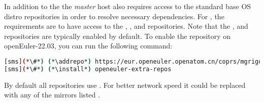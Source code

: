 In addition to the \OHPC{} 
\iftoggle{isxCAT}{and \xCAT{} package repositories,}{package repository,}
the {\em master} host also requires access to the standard base OS distro
repositories in order to resolve necessary dependencies. For \baseOS{}, the
requirements are to have access to the {\color{purple}{OS}},
{\color{purple}{Everything}}, {\color{purple}{EPOL main}} and
{\color{purple}{EPOL update}} repositories.  Note that the
{\color{purple}{OS}}, {\color{purple}{Everything}} and {\color{purple}{EPOL
main}} repositories are typically enabled by default.  To enable the 
{\color{purple}{EPOL update}} repository on openEuler-22.03, you can run the following
command:

\begin{lstlisting}[language=bash,keywords={},basicstyle=\fontencoding{T1}\fontsize{7.6}{10}\ttfamily]
[sms](*\#*) (*\addrepo*) https://eur.openeuler.openatom.cn/coprs/mgrigorov/OpenHPC/repo/openeuler-22.03_LTS_SP3/mgrigorov-OpenHPC-openeuler-22.03_LTS_SP3.repo
[sms](*\#*) (*\install*) openeuler-extra-repos
\end{lstlisting}


By default all repositories use {\color{blue}{http://repo.openeuler.org}}. 
For better network speed it could be replaced with any of the mirrors listed
\href{https://www.openeuler.org/en/mirror/list/}{\color{blue}{here}}.
